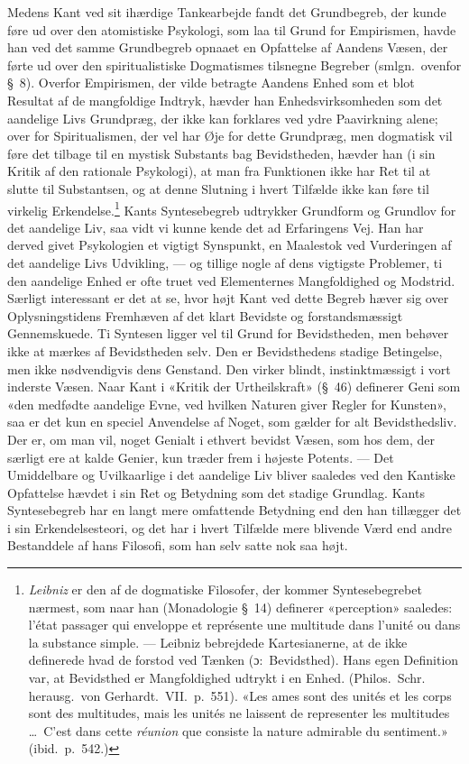 \documentclass[12pt,a4paper]{article}
\newcommand{\apage}[1]{\marginnote{\footnotesize\textit{[#1]}}}
\begin{document}
Medens Kant ved sit ihærdige Tankearbejde fandt det Grundbegreb, der
kunde føre ud over den atomistiske Psykologi, som laa til Grund for
Empirismen, havde han ved det samme Grundbegreb opnaaet en Opfattelse af
Aandens Væsen, der førte ud over den spiritualistiske Dogmatismes
tilsnegne Begreber (smlgn.\ ovenfor §\ 8). Overfor Empirismen, der vilde
betragte Aandens Enhed som et blot Resultat af de mangfoldige Indtryk,
hævder han Enhedsvirksomheden som det aandelige Livs Grundpræg, der ikke
kan forklares ved ydre Paavirkning alene; over for Spiritualismen, der
vel har Øje for dette Grundpræg, men dogmatisk vil føre det tilbage til
en mystisk Substants bag Bevidstheden, hævder han (i sin Kritik af den
rationale Psykologi), at man fra Funktionen ikke har Ret til at slutte til
Substantsen, og at denne Slutning i hvert Tilfælde ikke kan føre til
virkelig Erkendelse.\footnote{\emph{Leibniz} er den af de dogmatiske Filosofer,
der kommer Syntesebegrebet nærmest, som naar han (Monadologie §\ 14)
definerer «perception» saaledes: l'état passager qui enveloppe et
représente une multitude dans l'unité ou dans la substance simple. ---
Leibniz bebrejdede Kartesianerne, at de ikke definerede hvad de forstod
ved Tænken (ɔ:\ Bevidsthed). Hans egen Definition var, at Bevidsthed er
Mangfoldighed udtrykt i en Enhed. (Philos.\ Schr. herausg.\ von
Gerhardt.\ VII.\ p.\ 551). «Les ames sont des unités et les corps
sont des multitudes, mais les unités ne laissent de representer les
multitudes \ldots\ C'est dans cette \emph{réunion} que consiste la nature
admirable du sentiment.» (ibid.\ p.\ 542.)} Kants Syntesebegreb
udtrykker Grundform og Grundlov for det aandelige Liv, saa vidt vi \apage{58} kunne
kende det ad Erfaringens Vej. Han har derved givet Psykologien et vigtigt
Synspunkt, en Maalestok ved Vurderingen af det aandelige Livs Udvikling,
--- og tillige nogle af dens vigtigste Problemer, ti den aandelige Enhed
er ofte truet ved Elementernes Mangfoldighed og Modstrid. Særligt
interessant er det at se, hvor højt Kant ved dette Begreb hæver sig over
Oplysningstidens Fremhæven af det klart Bevidste og forstandsmæssigt
Gennemskuede. Ti Syntesen ligger vel til Grund for Bevidstheden, men
behøver ikke at mærkes af Bevidstheden selv. Den er Bevidsthedens stadige
Betingelse, men ikke nødvendigvis dens Genstand. Den virker blindt,
instinktmæssigt i vort inderste Væsen. Naar Kant i «Kritik der
Urtheilskraft» (§\ 46) definerer Geni som «den medfødte aandelige Evne,
ved hvilken Naturen giver Regler for Kunsten», saa er det kun en speciel
Anvendelse af Noget, som gælder for alt Bevidsthedsliv. Der er, om man
vil, noget Genialt i ethvert bevidst Væsen, som hos dem, der særligt ere
at kalde Genier, kun træder frem i højeste Potents. --- Det Umiddelbare
og Uvilkaarlige i det aandelige Liv bliver saaledes ved den Kantiske
Opfattelse hævdet i sin Ret og Betydning som det stadige Grundlag. Kants
Syntesebegreb har en langt mere omfattende Betydning end den han tillægger
det i sin Erkendelsesteori, og det har i hvert Tilfælde mere blivende
Værd end andre Bestanddele af hans Filosofi, som han selv satte nok saa
højt.
\end{document}
